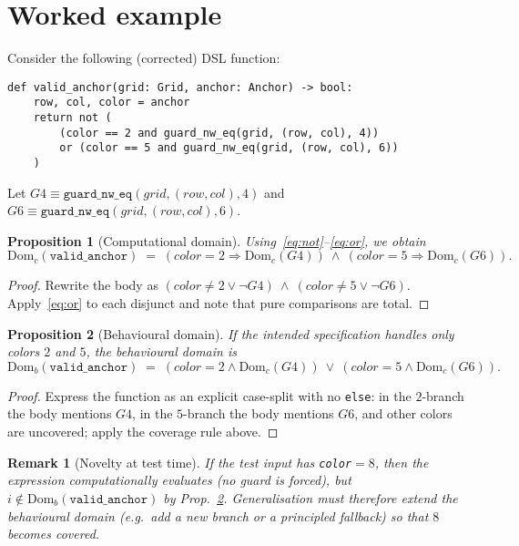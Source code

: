 \documentclass[11pt]{article}
\newtheorem{proposition}{Proposition}
\newtheorem{remark}{Remark}
\newcommand{\Domc}{\mathrm{Dom}_c}
\newcommand{\Domb}{\mathrm{Dom}_b}
\begin{document}
\section{Worked example}

Consider the following (corrected) DSL function:
\begin{lstlisting}
def valid_anchor(grid: Grid, anchor: Anchor) -> bool:
    row, col, color = anchor
    return not (
        (color == 2 and guard_nw_eq(grid, (row, col), 4))
        or (color == 5 and guard_nw_eq(grid, (row, col), 6))
    )
\end{lstlisting}
Let $G4 \equiv \texttt{guard\_nw\_eq}(grid,(row,col),4)$ and $G6 \equiv \texttt{guard\_nw\_eq}(grid,(row,col),6)$.

\begin{proposition}[Computational domain]
\label{prop:domc}
Using~\eqref{eq:not}--\eqref{eq:or}, we obtain
\[
\Domc(\texttt{valid\_anchor})
\;=\;
(color{=}2 \Rightarrow \Domc(G4)) \ \land\ (color{=}5 \Rightarrow \Domc(G6)).
\]
\end{proposition}

\begin{proof}
Rewrite the body as $(color{\neq}2 \lor \lnot G4)\ \land\ (color{\neq}5 \lor \lnot G6)$. Apply~\eqref{eq:or} to each disjunct and note that pure comparisons are total.
\end{proof}

\begin{proposition}[Behavioural domain]
\label{prop:domb}
If the intended specification handles only colors $2$ and $5$, the behavioural domain is
\[
\Domb(\texttt{valid\_anchor})
\;=\;
(color{=}2 \land \Domc(G4)) \ \lor\ (color{=}5 \land \Domc(G6)).
\]
\end{proposition}

\begin{proof}
Express the function as an explicit case-split with no \texttt{else}: in the $2$-branch the body mentions $G4$, in the $5$-branch the body mentions $G6$, and other colors are uncovered; apply the coverage rule above.
\end{proof}

\begin{remark}[Novelty at test time]
If the test input has \texttt{color}$=8$, then the expression \emph{computationally} evaluates (no guard is forced), but $i\notin\Domb(\texttt{valid\_anchor})$ by Prop.~\ref{prop:domb}. Generalisation must therefore extend the behavioural domain (e.g.\ add a new branch or a principled fallback) so that $8$ becomes covered.
\end{remark}
\end{document}
